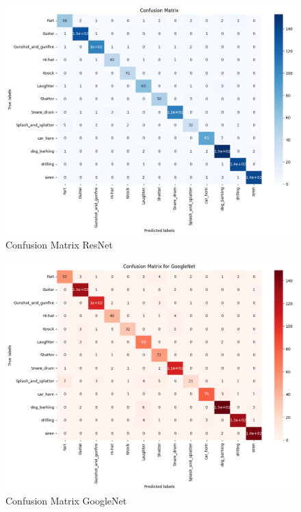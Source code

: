 \documentclass{article}
\begin{document}
\begin{figure}[!hp]
  \centering
  \begin{minipage}[b]{\textwidth}
    \includegraphics[width=\textwidth]{conf_RN.png}
    \caption{Confusion Matrix ResNet}
  \end{minipage}
  \hfill
\end{figure}

\begin{figure}[!hp]
  \centering
  \begin{minipage}[b]{\textwidth}
    \includegraphics[width=\textwidth]{conf_GN.png}
    \caption{Confusion Matrix GoogleNet}
  \end{minipage}
  \hfill
\end{figure}

\end{document}
